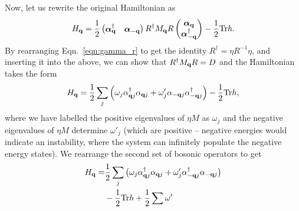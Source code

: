 Now, let us rewrite the original Hamiltonian as
\begin{align}
    H_{\textbf q} = \frac{1}{2}
    \begin{pmatrix}
        \bm \alpha^\dag_{\textbf q} &
        \bm \alpha_{-\textbf q}
    \end{pmatrix}
    R^\dag M_{\textbf q} R
    \begin{pmatrix}
        \bm \alpha_{\textbf q} \\
        \bm \alpha^\dag_{-\textbf q}
    \end{pmatrix}- \frac{1}{2} \textup{Tr} h.
\end{align}
By rearranging Eqn.~\ref{eqn:gamma_r} to get the identity $R^\dag = \eta R^{-1} \eta$, and inserting it into the above, we can show that $R^\dag M_{\textbf q} R = D$ and the Hamiltonian takes the form
\begin{align}
    H_{\textbf q} = \frac{1}{2}
    \sum_{j} \left ( 
    \omega_{j} \alpha_{\textbf q j}^\dag \alpha_{\textbf q j}
    + \omega'_{j} \alpha_{- \textbf q j}\alpha_{ - \textbf q j}^\dag 
    \right ) - \frac{1}{2} \textup{Tr} h,
\end{align}
where we have labelled the positive eigenvalues of $\eta M$ as $\omega_j$ and the negative eigenvalues of $\eta M$ determine $\omega'_j$ (which are positive -- negative energies would indicate an instability, where the system can infinitely populate the negative energy states). We rearrange the second set of bosonic operators to get
\begin{align}\begin{split}
    H_{\textbf q} = &\frac{1}{2}
    \sum_{j} \big ( 
    \omega_{j} 
    \alpha_{\textbf q j}^\dag 
    \alpha_{\textbf q j}
     + \omega'_{j}
    \alpha_{ - \textbf q j}^\dag
    \alpha_{- \textbf q j}
    \big )\\
    & - \frac{1}{2}\textup{Tr} h + \frac{1}{2}\sum \omega ' 
\end{split}
\end{align}

